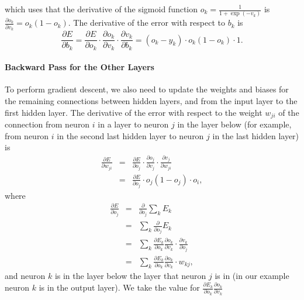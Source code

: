  which uses that the derivative of the sigmoid function $o_{k}=\frac{1}{1+\exp(-v_{k})}$
is $\frac{\partial o_{k}}{\partial v_{k}}=o_{k}(1-o_{k})$. The derivative
of the error with respect to $b_{k}$ is
\begin{equation}
\frac{\partial E}{\partial b_{k}}=\frac{\partial E}{\partial o_{k}}\cdot\frac{\partial o_{k}}{\partial v_{k}}\cdot\frac{\partial v_{k}}{\partial b_{k}}=(o_{k}-y_{k})\cdot o_{k}(1-o_{k})\cdot1.
\end{equation}

\paragraph{Backward Pass for the Other Layers}

To perform gradient descent, we also need to update the weights and
biases for the remaining connections between hidden layers, and from
the input layer to the first hidden layer. The derivative of the error
with respect to the weight $w_{ji}$ of the connection from neuron
$i$ in a layer to neuron $j$ in the layer below (for example, from
neuron $i$ in the second last hidden layer to neuron $j$ in the
last hidden layer) is
\begin{eqnarray}
\frac{\partial E}{\partial w_{ji}} & = & \frac{\partial E}{\partial o_{j}}\cdot\frac{\partial o_{j}}{\partial v_{j}}\cdot\frac{\partial v_{j}}{\partial w_{ji}}\label{eq:backpropagation-error-wrt-weight-other-layers}\\
 & = & \frac{\partial E}{\partial o_{j}}\cdot o_{j}(1-o_{j})\cdot o_{i},\nonumber 
\end{eqnarray}
 where 
\begin{eqnarray}
\frac{\partial E}{\partial o_{j}} & = & \frac{\partial}{\partial o_{j}}\sum_{k}E_{k}\nonumber \\
 & = & \sum_{k}\frac{\partial}{\partial o_{j}}E_{k}\nonumber \\
 & = & \sum_{k}\frac{\partial E_{k}}{\partial o_{k}}\frac{\partial o_{k}}{\partial v_{k}}\cdot\frac{\partial v_{k}}{\partial o_{j}}\nonumber \\
 & = & \sum_{k}\frac{\partial E_{k}}{\partial o_{k}}\frac{\partial o_{k}}{\partial v_{k}}\cdot w_{kj},\label{eq:backpropagation-error-wrt-output-other-layers}
\end{eqnarray}
and neuron $k$ is in the layer below the layer that neuron $j$ is
in (in our example neuron $k$ is in the output layer). We take the
value for $\frac{\partial E_{k}}{\partial o_{k}}\frac{\partial o_{k}}{\partial v_{k}}$
